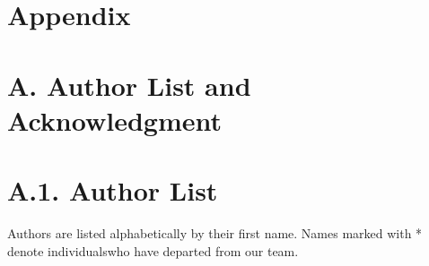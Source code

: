 \documentclass[
  10
]{article}
\begin{document}
\section{Appendix}\label{appendix}

\section{A. Author List and
Acknowledgment}\label{a.-author-list-and-acknowledgment}

\section{A.1. Author List}\label{a.1.-author-list}

Authors are listed alphabetically by their first name. Names marked with
* denote individualswho have departed from our team.
\end{document}
